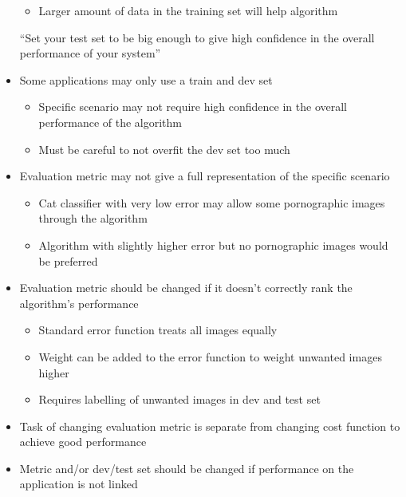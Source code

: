 \documentclass[12pt, letterpaper]{article}
\begin{document}
\begin{itemize}
\begin{itemize}
            \item Larger amount of data in the training set will help algorithm 
        \end{itemize}
        \vspace{5mm}
        \begin{center}
            ``Set your test set to be big enough to give high confidence in the overall performance of your system''
        \end{center}
        \item Some applications may only use a train and dev set
        \begin{itemize}
            \item Specific scenario may not require high confidence in the overall performance of the algorithm 
            \item Must be careful to not overfit the dev set too much
        \end{itemize}
        \item Evaluation metric may not give a full representation of the specific scenario
        \begin{itemize}
            \item Cat classifier with very low error may allow some pornographic images through the algorithm
            \item Algorithm with slightly higher error but no pornographic images would be preferred
        \end{itemize}
        \item Evaluation metric should be changed if it doesn't correctly rank the algorithm's performance
        \begin{itemize}
            \item Standard error function treats all images equally 
            \item Weight can be added to the error function to weight unwanted images higher
            \item Requires labelling of unwanted images in dev and test set
        \end{itemize}
        \item Task of changing evaluation metric is separate from changing cost function to achieve good performance
        \item Metric and/or dev/test set should be changed if performance on the application is not linked
    \end{itemize}
\end{document}
